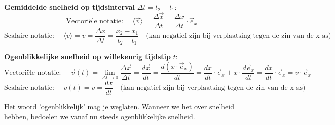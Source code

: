 \documentclass{ximera}
\begin{document}


\textbf{Gemiddelde snelheid op tijdsinterval } $\Delta t = t_2 - t_1$:
\[
\text{Vectoriële notatie: } \quad
\langle \vec{v} \rangle = \frac{\Delta \vec{x}}{\Delta t} = \frac{\Delta x}{\Delta t} \cdot \vec{e}_x
\]
\[
\text{Scalaire notatie: } \quad
\langle v \rangle = \bar{v} = \frac{\Delta x}{\Delta t} = \frac{x_2 - x_1}{t_2 - t_1} 
\quad \text{(kan negatief zijn bij verplaatsing tegen de zin van de x-as)}
\]

\textbf{Ogenblikkelijke snelheid op willekeurig tijdstip } $t$:
\[
\text{Vectoriële notatie: } \quad
\vec{v}(t) = \lim_{\Delta t \to 0} \frac{\Delta \vec{x}}{\Delta t} = \frac{d\vec{x}}{dt} 
= \frac{d(x \cdot \vec{e}_x)}{dt} = \frac{dx}{dt} \cdot \vec{e}_x + x \cdot \frac{d\vec{e}_x}{dt} = \frac{dx}{dt} \cdot \vec{e}_x = v \cdot \vec{e}_x
\]
\[
\text{Scalaire notatie: } \quad
v(t) = v = \frac{dx}{dt} \quad \text{(kan negatief zijn bij verplaatsing tegen de zin van de x-as)}
\]


\begin{remark}
	Het woord 'ogenblikkelijk' mag je weglaten. Wanneer we het over snelheid hebben, bedoelen we vanaf nu steeds ogenblikkelijke snelheid.
\end{remark}
\end{document}
